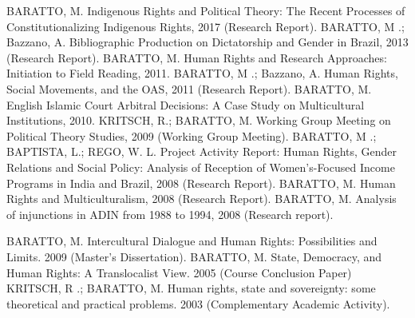 
\begin{cvcitems}
  \cvcitem
      {BARATTO, M.}
      {Indigenous Rights and Political Theory: The Recent Processes of Constitutionalizing Indigenous Rights, 2017 (Research Report).}
  \cvcitem
      {BARATTO, M .; Bazzano, A.}
      {Bibliographic Production on Dictatorship and Gender in Brazil, 2013 (Research Report).}
  \cvcitem
      {BARATTO, M.}
      {Human Rights and Research Approaches: Initiation to Field Reading, 2011.}
  \cvcitem
      {BARATTO, M .; Bazzano, A.}
      {Human Rights, Social Movements, and the OAS, 2011 (Research Report).}
  \cvcitem
      {BARATTO, M.}
      {English Islamic Court Arbitral Decisions: A Case Study on Multicultural Institutions, 2010.}
  \cvcitem
      {KRITSCH, R.; BARATTO, M.}
      {Working Group Meeting on Political Theory Studies, 2009 (Working Group Meeting).}
  \cvcitem
      {BARATTO, M .; BAPTISTA, L.; REGO, W. L.}
      {Project Activity Report: Human Rights, Gender Relations and Social Policy: Analysis of Reception of Women's-Focused Income Programs in India and Brazil, 2008 (Research Report).}
  \cvcitem
      {BARATTO, M.}
      {Human Rights and Multiculturalism, 2008 (Research Report).}
  \cvcitem
      {BARATTO, M.}
      {Analysis of injunctions in ADIN from 1988 to 1994, 2008 (Research report).}
\end{cvcitems}


\begin{cvcitems}
  \cvcitem
      {BARATTO, M.}
      {Intercultural Dialogue and Human Rights: Possibilities and Limits. 2009 (Master's Dissertation).}
  \cvcitem
      {BARATTO, M.}
      {State, Democracy, and Human Rights: A Translocalist View. 2005 (Course Conclusion Paper)}
  \cvcitem
      {KRITSCH, R .; BARATTO, M.}
      {Human rights, state and sovereignty: some theoretical and practical problems. 2003 (Complementary Academic Activity).}
\end{cvcitems}
